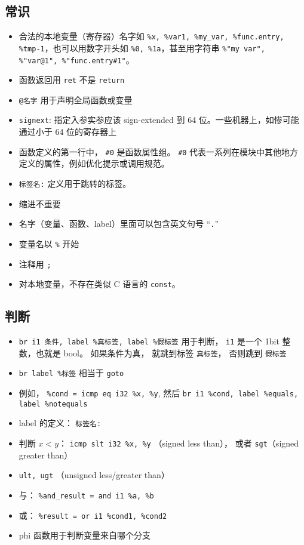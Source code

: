 \subsection{常识}
\begin{itemize}
\item 合法的本地变量（寄存器）名字如 \verb`%x, %var1, %my_var, %func.entry, %tmp-1`，也可以用数字开头如 \verb`%0, %1a`，甚至用字符串 \verb`%"my var", %"var@1", %"func.entry#1"`。
\item 函数返回用 \verb`ret` 不是 \verb`return`
\item \verb`@名字` 用于声明全局函数或变量
\item \verb`signext`: 指定入参实参应该 sign-extended 到 64 位。一些机器上，如惨可能通过小于 64 位的寄存器上
\item 函数定义的第一行中， \verb`#0` 是函数属性组。 \verb`#0` 代表一系列在模块中其他地方定义的属性，例如优化提示或调用规范。
\item \verb`标签名:` 定义用于跳转的标签。
\item 缩进不重要
\item 名字（变量、函数、label）里面可以包含英文句号 “\verb`.`”
\item 变量名以 \verb`%` 开始
\item 注释用 \verb`;`
\item 对本地变量，不存在类似 C 语言的 \verb`const`。
\end{itemize}

\subsection{判断}
\begin{itemize}
\item \verb`br i1 条件, label %真标签, label %假标签` 用于判断， \verb`i1` 是一个 1bit 整数，也就是 bool。 如果条件为真， 就跳到标签 \verb`真标签`， 否则跳到 \verb`假标签`
\item \verb`br label %标签` 相当于 \verb`goto`
\item 例如， \verb`%cond = icmp eq i32 %x, %y`, 然后 \verb`br i1 %cond, label %equals, label %notequals`
\item label 的定义： \verb`标签名:`
\item 判断 $x < y$： \verb`icmp slt i32 %x, %y` （signed less than）， 或者 \verb`sgt`（signed greater than）
\item \verb`ult, ugt` （unsigned less/greater than）
\item 与： \verb`%and_result = and i1 %a, %b`
\item 或： \verb`%result = or i1 %cond1, %cond2`
\item phi 函数用于判断变量来自哪个分支
\end{itemize}


